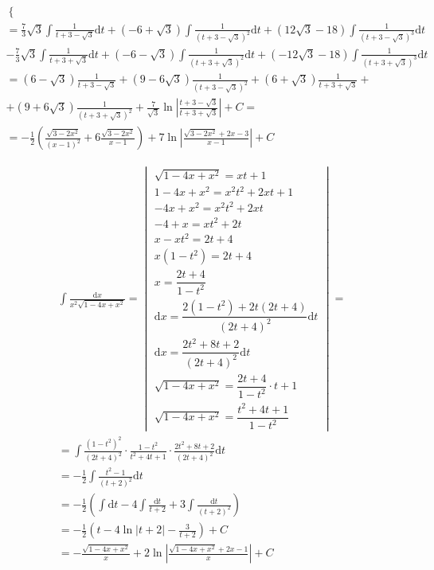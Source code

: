 \begin{gather*}
\begin{cases}
\end{cases}\\
= \frac{7}{3}\sqrt{3}\int{\frac{1}{t+3-\sqrt{3}}\mbox{d}t}+(-6+\sqrt{3})\int{\frac{1}{(t+3-\sqrt{3})^2}\mbox{d}t}
  +(12\sqrt{3}-18)\int{\frac{1}{(t+3-\sqrt{3})^3}\mbox{d}t}\\-\frac{7}{3}\sqrt{3}\int{\frac{1}{t+3+\sqrt{3}}\mbox{d}t}
    +(-6-\sqrt{3})\int{\frac{1}{(t+3+\sqrt{3})^2}\mbox{d}t}+(-12\sqrt{3}-18)\int{\frac{1}{(t+3+\sqrt{3})^3}\mbox{d}t} \\
= (6-\sqrt{3})\frac{1}{t+3-\sqrt{3}}+(9-6\sqrt{3})\frac{1}{(t+3-\sqrt{3})^2}+(6+\sqrt{3})\frac{1}{t+3+\sqrt{3}} + \\
  +(9+6\sqrt{3})\frac{1}{(t+3+\sqrt{3})^2}+\frac{7}{\sqrt{3}}\ln{\left|\frac{t+3-\sqrt{3}}{t+3+\sqrt{3}}\right|} + C = \\
= -\frac{1}{2}(\frac{\sqrt{3-2x^2}}{(x-1)^2}+6\frac{\sqrt{3-2x^2}}{x-1})+7\ln{\left|\frac{\sqrt{3-2x^2}+2x-3}{x-1}\right|}+C
\end{gather*}




\begin{gather*}
\int{\frac{\mbox{d}x}{x^2\sqrt{1-4x+x^2}}}
= \begin{vmatrix}
  \sqrt{1-4x+x^2}=xt+1\\
  1-4x+x^2=x^2t^2+2xt+1\\
  -4x+x^2=x^2t^2+2xt\\
  -4+x=xt^2+2t\\
  x-xt^2=2t+4\\
  x(1-t^2)=2t+4\\
  x=\dfrac{2t+4}{1-t^2}\\
  \mbox{d}x=\dfrac{2(1-t^2)+2t(2t+4)}{(2t+4)^2}\mbox{d}t\\
  \mbox{d}x=\dfrac{2t^2+8t+2}{(2t+4)^2}\mbox{d}t\\
  \sqrt{1-4x+x^2}=\dfrac{2t+4}{1-t^2}\cdot t+1\\
  \sqrt{1-4x+x^2}=\dfrac{t^2+4t+1}{1-t^2}
\end{vmatrix} = \\
= \int{\frac{(1-t^2)^2}{(2t+4)^2}\cdot\frac{1-t^2}{t^2+4t+1}\cdot \frac{2t^2+8t+2}{(2t+4)^2}\mbox{d}t}\\
=-\frac{1}{2}\int{\frac{t^2-1}{(t+2)^2}\mbox{d}t}\\
=-\frac{1}{2}\left(\int{\mbox{d}t}-4\int{\frac{\mbox{d}t}{t+2}}+3\int\frac{\mbox{d}t}{(t+2)^2}\right)\\
=-\frac{1}{2}\left(t-4\ln{|t+2|}-\frac{3}{t+2}\right)+C\\
=-\frac{\sqrt{1-4x+x^2}}{x}+2\ln{\left|\frac{\sqrt{1-4x+x^2}+2x-1}{x}\right|}+C
\end{gather*}

